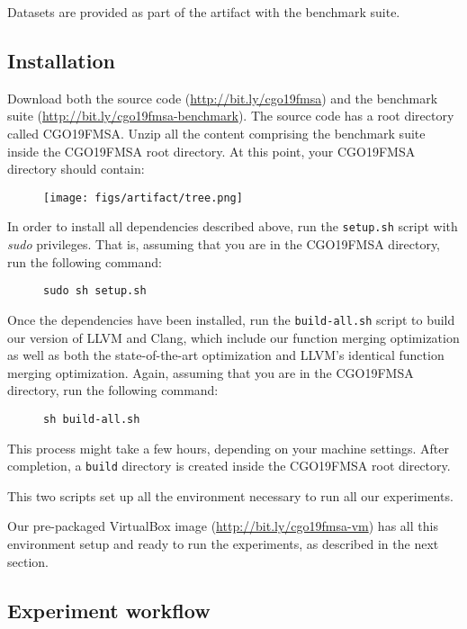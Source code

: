 {Datasets are provided as part of the artifact with the benchmark suite.

\subsection{Installation}

Download both the source code (\url{http://bit.ly/cgo19fmsa}) and the benchmark suite
(\url{http://bit.ly/cgo19fmsa-benchmark}).
The source code has a root directory called CGO19FMSA.
Unzip all the content comprising the benchmark suite inside the CGO19FMSA root directory.
At this point, your CGO19FMSA directory should contain:
\begin{figure}[h]
\texttt{[image: figs/artifact/tree.png]}
\end{figure}

In order to install all dependencies described above, run the \texttt{setup.sh}
script with \textit{sudo} privileges. That is, assuming that you are in the
CGO19FMSA directory, run the following command:
\begin{figure}[h]
\texttt{sudo sh setup.sh}
\end{figure}

Once the dependencies have been installed, run the \texttt{build-all.sh}
script to build our version of LLVM and Clang, which include our function
merging optimization as well as both the state-of-the-art optimization and LLVM's
identical function merging optimization.
Again, assuming that you are in the CGO19FMSA directory, run the following
command:
\begin{figure}[h]
\texttt{sh build-all.sh}
\end{figure}

This process might take a few hours, depending on your machine settings.
After completion, a \texttt{build} directory is created inside the CGO19FMSA
root directory.

This two scripts set up all the environment necessary to run all our experiments.

Our pre-packaged VirtualBox image (\url{http://bit.ly/cgo19fmsa-vm})
has all this environment setup and ready to run the experiments, as described
in the next section.

\subsection{Experiment workflow}

}
